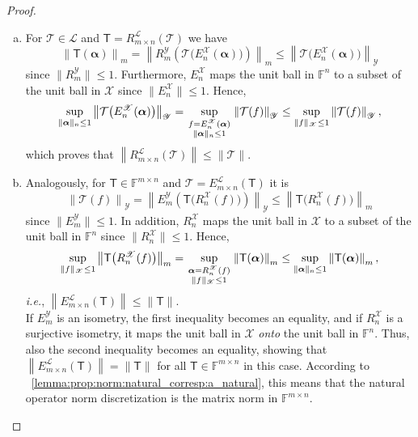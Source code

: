 \documentclass[a4paper]{paper}
\newcommand{\Spc}[1]{\mathscr{#1}}
\newcommand{\Field}{\mathbb{F}}
\newcommand{\Op}[1]{\mathcal{#1}}
\newcommand{\DiscOp}[1]{\mathsf{#1}}
\newcommand*{\EXT}[2]{\ensuremath{E_{#1}^{#2}}}
\newcommand*{\REST}[2]{\ensuremath{R_{#1}^{#2}}}
\newcommand*{\RnX}{\ensuremath{\REST{n}{\Spc{X}}}}
\newcommand*{\RmY}{\ensuremath{\REST{m}{\Spc{Y}}}}
\newcommand*{\EnX}{\ensuremath{\EXT{n}{\Spc{X}}}}
\newcommand*{\EmY}{\ensuremath{\EXT{m}{\Spc{Y}}}}
\newcommand*{\STACK}[2]{\genfrac{}{}{0pt}{1}{#1}{#2}}
\newcommand*{\NORM}[1]{\ensuremath{\lVert #1 \rVert}}
\newcommand*{\NORMLR}[1]{\ensuremath{\left\lVert #1 \right\rVert}}
\newcommand{\ie}{\textsl{i.e.}\xspace}
\newcommand{\valpha}{\boldsymbol{\alpha}}
\begin{document}
\begin{proof}~
 \begin{enumerate}[(a)]
  \item For $\Op{T} \in \Spc{L}$ and $\DiscOp{T} = \REST{m\times n}{\Spc{L}}(\Op{T})$ we have
  \begin{equation*}
   \NORMLR{\DiscOp{T}(\valpha)}_m = \NORMLR{\RmY \left( \Op{T}\big( \EnX(\valpha) \big) \right)}_m
   \leq \NORMLR{\Op{T}\big( \EnX(\valpha) \big)}_{\Spc{Y}}
  \end{equation*}
  since $\NORM{\RmY} \leq 1$. Furthermore, $\EnX$ maps the unit ball in $\Field^n$ to a subset of the unit ball in
  $\Spc{X}$ since $\NORM{\EnX} \leq 1$. Hence,
  \begin{equation*}
   \sup_{\NORM{\valpha}_n \leq 1} \NORMLR{\Op{T}\big( \EnX(\valpha) \big)}_{\Spc{Y}}
   = \sup_{\STACK{f=\EnX(\valpha)}{\NORM{\valpha}_n \leq 1}} \NORMLR{\Op{T}(f)}_{\Spc{Y}}
   \leq \sup_{\NORM{f}_{\Spc{X}} \leq 1} \NORMLR{\Op{T}(f)}_{\Spc{Y}},
  \end{equation*}
  which proves that $\NORMLR{\REST{m\times n}{\Spc{L}}(\Op{T})} \leq \NORM{\Op{T}}$.

  \item Analogously, for $\DiscOp{T} \in \Field^{m\times n}$ and $\Op{T} = \EXT{m\times n}{\Spc{L}}(\DiscOp{T})$ it is
  \begin{equation*}
   \NORMLR{\Op{T}(f)}_{\Spc{Y}} = \NORMLR{\EmY \left( \DiscOp{T}\big( \RnX(f) \big) \right)}_{\Spc{Y}}
   \leq \NORMLR{\DiscOp{T}\big( \RnX(f) \big)}_m
  \end{equation*}
  since $\NORM{\EmY} \leq 1$. In addition, $\RnX$ maps the unit ball in $\Spc{X}$ to a subset of the unit 
  ball in $\Field^n$ since $\NORM{\RnX} \leq 1$. Hence,
  \begin{equation*}
   \sup_{\NORM{f}_{\Spc{X}} \leq 1} \NORMLR{\DiscOp{T}\big( \RnX(f) \big)}_m
   = \sup_{\STACK{\valpha=\RnX(f)}{\NORM{f}_{\Spc{X}} \leq 1}} \NORMLR{\DiscOp{T}(\valpha)}_m
   \leq \sup_{\NORM{\valpha}_n \leq 1} \NORMLR{\DiscOp{T}(\valpha)}_m,
  \end{equation*}
  \ie, $\NORMLR{E_{m\times n}^{\Spc{L}}(\DiscOp{T})} \leq \NORM{\DiscOp{T}}$.\\[1em]
  If $\EmY$ is an isometry, the first inequality becomes an equality, and if $\RnX$ is a surjective isometry, it maps
  the unit ball in $\Spc{X}$ \emph{onto} the unit ball in $\Field^n$. Thus, also the second inequality becomes an 
  equality, showing that $\NORMLR{\EXT{m\times n}{\Spc{L}}(\DiscOp{T})} = \NORM{\DiscOp{T}}$ for all 
  $\DiscOp{T} \in \Field^{m\times n}$ in this case. According to 
  ~\eqref{lemma:prop:norm:natural_corresp:a_natural}, this means that the natural 
  operator norm discretization is the matrix norm in $\Field^{m\times n}$.
 \end{enumerate}
\end{proof}
\end{document}
